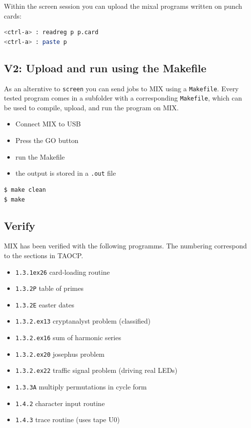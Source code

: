 \documentclass[a4paper,ngerman]{scrartcl}
\begin{document}
Within  the screen session you can upload the mixal programs written on punch cards:
\begin{lstlisting}[language=bash,numbers=none,frame=none]
<ctrl-a> : readreg p p.card
<ctrl-a> : paste p
\end{lstlisting}

\subsection{V2: Upload and run using the Makefile}
As an alterntive to \lstinline|screen| you can send jobs to MIX using a \lstinline|Makefile|. Every tested program comes in a subfolder with a corresponding \lstinline|Makefile|, which can be used to compile, upload, and run the program on MIX.

\begin{itemize}
	\item Connect MIX to USB
	\item Press the GO button
	\item run the Makefile
	\item the output is stored in a \lstinline|.out| file
\end{itemize}

\begin{lstlisting}[numbers=none,frame=none]
$ make clean
$ make
\end{lstlisting}


\subsection{Verify}

MIX has been verified with the following programms. The numbering correspond to the sections in TAOCP.
\begin{itemize}	
\item \lstinline|1.3.1ex26| card-loading routine
\item \lstinline|1.3.2P| table of primes
\item \lstinline|1.3.2E| easter dates
\item \lstinline|1.3.2.ex13| cryptanalyst problem (classified)
\item \lstinline|1.3.2.ex16| sum of harmonic series
\item \lstinline|1.3.2.ex20| josephus problem
\item \lstinline|1.3.2.ex22| traffic signal problem (driving real LEDs)
\item \lstinline|1.3.3A| multiply permutations in cycle form
\item \lstinline|1.4.2|  character input routine
\item \lstinline|1.4.3|  trace routine (uses tape U0)
\end{itemize}
\end{document}
